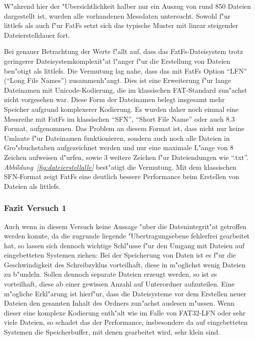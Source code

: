 \documentclass[11pt]{article}
\newcommand*{\fig}[1]{\textit{Abbildung~\ref{#1}}}
\begin{document}
W"ahrend hier der "Ubersichtlichkeit halber nur ein Auszug von rund 850 Dateien dargestellt ist, wurden alle vorhandenen
Messdaten untersucht. Sowohl f"ur littlefs als auch f"ur FatFs setzt sich das typische Muster mit linear steigender Dateierstelldauer fort.

Bei genauer Betrachtung der Werte f"allt auf, dass das FatFs-Dateisystem trotz geringerer Dateisystemkomplexit"at l"anger
f"ur die Erstellung von Dateien ben"otigt als littlefs. Die Vermutung lag nahe, dass das mit FatFs Option \enquote{LFN} (\enquote{Long File Names})
zusammenh"angt. Dies ist eine Erweiterung f"ur lange Dateinamen mit Unicode-Kodierung, die im klassischen FAT-Standard zun"achst
nicht vorgesehen war. Diese Form der Dateinamen belegt insgesamt mehr Speicher aufgrund komplexerer Kodierung. Es wurden daher noch einmal eine Messreihe mit FatFs im klassischen \enquote{SFN}, \enquote{Short File Name} oder auch 8.3 Format,
aufgenommen. Das Problem an diesem Format ist, dass nicht nur keine Umlaute f"ur Dateinamen funktionieren, sondern auch noch
alle Dateien in Gro"sbuchstaben aufgezeichnet werden und nur eine maximale L"ange von 8 Zeichen aufweisen d"urfen, sowie 3 weitere Zeichen
f"ur Dateiendungen wie \enquote{.txt}.
\fig{fig:dateierstellalle} best"atigt die Vermutung. Mit dem klassischen SFN-Format zeigt FatFs eine deutlich bessere Performance
beim Erstellen von Dateien als littlefs. 

\subsubsection*{Fazit Versuch 1}
Auch wenn in diesem Versuch keine Aussage "uber die Datenintegrit"at getroffen werden konnte, da die zugrunde liegende "Ubertragungsebene
fehlerfrei gearbeitet hat, so lassen sich dennoch wichtige Schl"usse f"ur den Umgang mit Dateien auf eingebetteten Systemen ziehen:
Bei der Speicherung von Daten ist es f"ur die Geschwindigkeit des Schreibzyklus vorteilhaft, diese in m"oglichst wenig Dateien zu b"undeln. 
Sollen dennoch separate Dateien erzeugt werden, so ist es vorteilhaft, diese ab einer gewissen Anzahl auf Unterordner aufzuteilen.
Eine m"ogliche Erkl"arung ist hierf"ur, dass die Dateisysteme vor dem Erstellen neuer Dateien den gesamten Inhalt des Ordners
zun"achst auslesen m"ussen. Wenn dieser eine komplexe Kodierung enth"alt wie im Falle von FAT32-LFN oder sehr viele Dateien, so schadet
das der Performance, insbesondere da auf eingebetteten Systemen die Speicherbuffer, mit denen gearbeitet wird, sehr klein sind. \\
\end{document}
